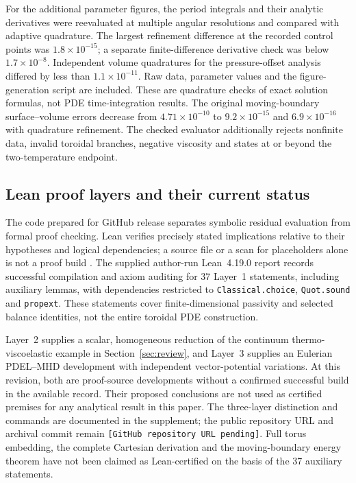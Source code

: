\documentclass[11pt,a4paper]{article}
\theoremstyle{remark}\newtheorem{remark}{Remark}
\numberwithin{equation}{section}
\newcommand{\repositoryplaceholder}{\texttt{[GitHub repository URL pending]}}
\begin{document}
For the additional parameter figures, the period integrals and their analytic derivatives were reevaluated at multiple angular resolutions and compared with adaptive quadrature. The largest refinement difference at the recorded control points was $1.8\times10^{-15}$; a separate finite-difference derivative check was below $1.7\times10^{-8}$. Independent volume quadratures for the pressure-offset analysis differed by less than $1.1\times10^{-11}$. Raw data, parameter values and the figure-generation script are included. These are quadrature checks of exact solution formulas, not PDE time-integration results. The original moving-boundary surface--volume errors decrease from $4.71\times10^{-10}$ to $9.2\times10^{-15}$ and $6.9\times10^{-16}$ with quadrature refinement. The checked evaluator additionally rejects nonfinite data, invalid toroidal branches, negative viscosity and states at or beyond the two-temperature endpoint.

\subsection{Lean proof layers and their current status}\label{sec:formal}
The code prepared for GitHub release separates symbolic residual evaluation from formal proof checking. Lean verifies precisely stated implications relative to their hypotheses and logical dependencies; a source file or a scan for placeholders alone is not a proof build \citep{LeanValidation}. The supplied author-run Lean~4.19.0 report records successful compilation and axiom auditing for 37 Layer~1 statements, including auxiliary lemmas, with dependencies restricted to \texttt{Classical.choice}, \texttt{Quot.sound} and \texttt{propext}. These statements cover finite-dimensional passivity and selected balance identities, not the entire toroidal PDE construction.

Layer~2 supplies a scalar, homogeneous reduction of the continuum thermo-viscoelastic example in Section~\ref{sec:review}, and Layer~3 supplies an Eulerian PDEL--MHD development with independent vector-potential variations. At this revision, both are proof-source developments without a confirmed successful build in the available record. Their proposed conclusions are not used as certified premises for any analytical result in this paper. The three-layer distinction and commands are documented in the supplement; the public repository URL and archival commit remain \repositoryplaceholder. Full torus embedding, the complete Cartesian derivation and the moving-boundary energy theorem have not been claimed as Lean-certified on the basis of the 37 auxiliary statements.
\end{document}
